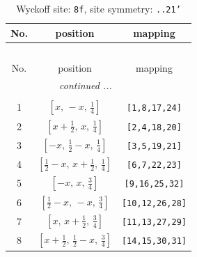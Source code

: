 \documentclass[fleqn,8pt]{jsarticle}
\begin{document}
\begin{longtable}{ccc}
\caption{Wyckoff site: {\tt 8f}, site symmetry: {\tt ..21'}}
 \\
 \hline \hline
No. & position & mapping \\ \hline \endfirsthead

\multicolumn{2}{l}{\tablename\ \thetable{}} \\
 \hline \hline
No. & position & mapping \\ \hline \endhead

 \hline \hline
\multicolumn{2}{r}{\footnotesize\it continued ...} \\ \endfoot

 \hline \hline
\multicolumn{2}{r}{} \\ \endlastfoot

1 & $\left[ x,\, - x,\, \frac{1}{4} \right]$ & {\tt [1,8,17,24]} \\ \hline
2 & $\left[ x + \frac{1}{2},\, x,\, \frac{1}{4} \right]$ & {\tt [2,4,18,20]} \\ \hline
3 & $\left[ - x,\, \frac{1}{2} - x,\, \frac{1}{4} \right]$ & {\tt [3,5,19,21]} \\ \hline
4 & $\left[ \frac{1}{2} - x,\, x + \frac{1}{2},\, \frac{1}{4} \right]$ & {\tt [6,7,22,23]} \\ \hline
5 & $\left[ - x,\, x,\, \frac{3}{4} \right]$ & {\tt [9,16,25,32]} \\ \hline
6 & $\left[ \frac{1}{2} - x,\, - x,\, \frac{3}{4} \right]$ & {\tt [10,12,26,28]} \\ \hline
7 & $\left[ x,\, x + \frac{1}{2},\, \frac{3}{4} \right]$ & {\tt [11,13,27,29]} \\ \hline
8 & $\left[ x + \frac{1}{2},\, \frac{1}{2} - x,\, \frac{3}{4} \right]$ & {\tt [14,15,30,31]} \\
\end{longtable}
\renewcommand{\arraystretch}{1.2}
\end{document}
